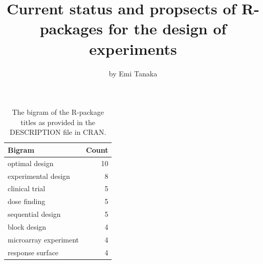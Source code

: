 \title{Current status and propsects of R-packages for the design of
experiments}
\author{by Emi Tanaka}

\maketitle


\begin{Schunk}
\begin{table}

\caption{\label{tab:bigram-title}The bigram of the R-package titles as provided in the DESCRIPTION file in CRAN.}
\centering
\begin{tabular}[t]{l|r}
\hline
Bigram & Count\\
\hline
optimal design & 10\\
\hline
experimental design & 8\\
\hline
clinical trial & 5\\
\hline
dose finding & 5\\
\hline
sequential design & 5\\
\hline
block design & 4\\
\hline
microarray experiment & 4\\
\hline
response surface & 4\\
\hline
\end{tabular}
\end{table}

\end{Schunk}

